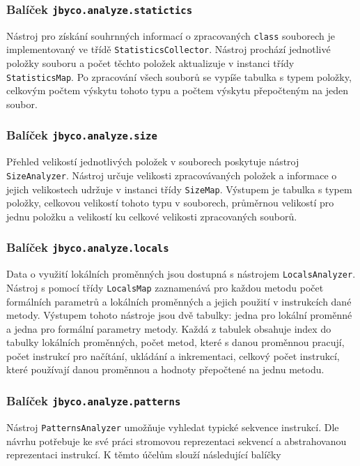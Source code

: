 \subsubsection{Balíček \texttt{jbyco.analyze.statictics}}

Nástroj pro získání souhrnných informací o zpracovaných \texttt{class} souborech je implementovaný ve třídě \texttt{StatisticsCollector}. Nástroj prochází jednotlivé položky souboru a  počet těchto položek aktualizuje v instanci třídy \texttt{StatisticsMap}. Po zpracování všech souborů se vypíše tabulka s typem položky, celkovým počtem výskytu tohoto typu a počtem výskytu přepočteným na jeden soubor. 

\subsubsection{Balíček \texttt{jbyco.analyze.size}}

Přehled velikostí jednotlivých položek v souborech poskytuje nástroj \texttt{SizeAnalyzer}. Nástroj určuje velikosti zpracovávaných položek a informace o jejich velikostech udržuje v instanci třídy \texttt{SizeMap}. Výstupem je tabulka s typem položky, celkovou velikostí tohoto typu v souborech, průměrnou velikostí pro jednu položku a velikostí ku celkové velikosti zpracovaných souborů. 

\subsubsection{Balíček \texttt{jbyco.analyze.locals}}

Data o využití lokálních proměnných jsou dostupná s nástrojem \texttt{LocalsAnalyzer}. Nástroj s pomocí třídy \texttt{LocalsMap} zaznamenává pro každou metodu počet formálních parametrů a lokálních proměnných a jejich použití v instrukcích dané metody. Výstupem tohoto nástroje jsou dvě tabulky: jedna pro lokální proměnné a jedna pro formální parametry metody. Každá z tabulek obsahuje index do tabulky lokálních proměnných, počet metod, které s danou proměnnou pracují, počet instrukcí pro načítání, ukládání a inkrementaci, celkový počet instrukcí, které používají danou proměnnou a hodnoty přepočtené na jednu metodu.

\subsubsection{Balíček \texttt{jbyco.analyze.patterns}}

Nástroj \texttt{PatternsAnalyzer} umožňuje vyhledat typické sekvence instrukcí. Dle návrhu potřebuje ke své práci stromovou reprezentaci sekvencí a abstrahovanou reprezentaci instrukcí. K těmto účelům slouží následující balíčky 

